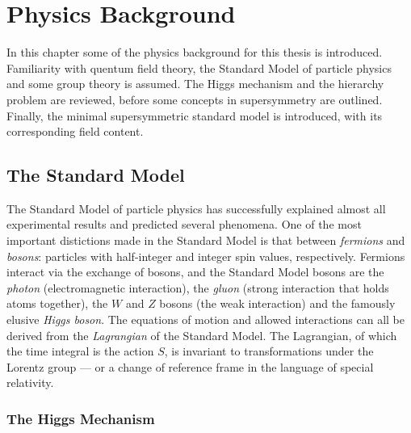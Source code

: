 \documentclass[twoside,english]{uiofysmaster}
\begin{document}
\tableofcontents


\chapter{Physics Background}

In this chapter some of the physics background for this thesis is introduced. Familiarity with quentum field theory, the Standard Model of particle physics and some group theory is assumed. The Higgs mechanism and the hierarchy problem are reviewed, before some concepts in supersymmetry are outlined. Finally, the minimal supersymmetric standard model is introduced, with its corresponding field content.

\section{The Standard Model}

The Standard Model of particle physics has successfully explained almost all experimental results and predicted several phenomena. One of the most important distictions made in the Standard Model is that between \textit{fermions} and \textit{bosons}: particles with half-integer and integer spin values, respectively. Fermions interact via the exchange of bosons, and the Standard Model bosons are the \textit{photon} (electromagnetic interaction), the \textit{gluon} (strong interaction that holds atoms together), the $W$ and $Z$ bosons (the weak interaction) and the famously elusive \textit{Higgs boson}. The equations of motion and allowed interactions can all be derived from the \textit{Lagrangian} of the Standard Model. The Lagrangian, of which the time integral is the action $S$, is invariant to transformations under the Lorentz group --- or a change of reference frame in the language of special relativity. 


\subsection{The Higgs Mechanism}
\end{document}
